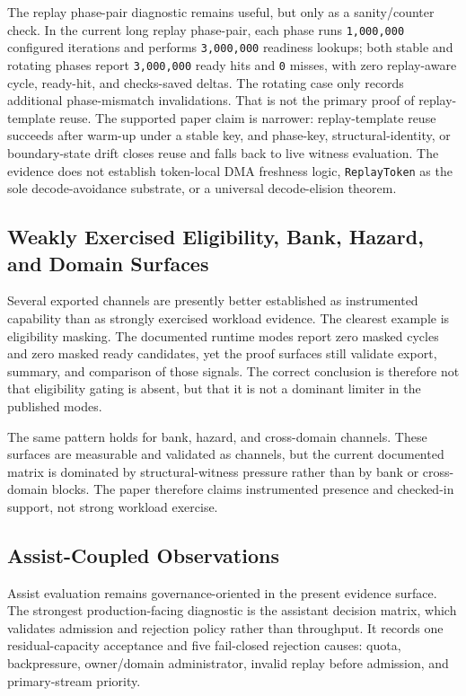 \documentclass[twocolumn]{article}
\begin{document}
The replay phase-pair diagnostic remains useful, but only as a sanity/counter check. In the current long replay phase-pair, each phase runs \texttt{1,000,000} configured iterations and performs \texttt{3,000,000} readiness lookups; both stable and rotating phases report \texttt{3,000,000} ready hits and \texttt{0} misses, with zero replay-aware cycle, ready-hit, and checks-saved deltas. The rotating case only records additional phase-mismatch invalidations. That is not the primary proof of replay-template reuse. The supported paper claim is narrower: replay-template reuse succeeds after warm-up under a stable key, and phase-key, structural-identity, or boundary-state drift closes reuse and falls back to live witness evaluation. The evidence does not establish token-local DMA freshness logic, \texttt{ReplayToken} as the sole decode-avoidance substrate, or a universal decode-elision theorem.


\subsection{Weakly Exercised Eligibility, Bank, Hazard, and Domain Surfaces}

Several exported channels are presently better established as instrumented capability than as strongly exercised workload evidence. The clearest example is eligibility masking. The documented runtime modes report zero masked cycles and zero masked ready candidates, yet the proof surfaces still validate export, summary, and comparison of those signals. The correct conclusion is therefore not that eligibility gating is absent, but that it is not a dominant limiter in the published modes.

The same pattern holds for bank, hazard, and cross-domain channels. These surfaces are measurable and validated as channels, but the current documented matrix is dominated by structural-witness pressure rather than by bank or cross-domain blocks. The paper therefore claims instrumented presence and checked-in support, not strong workload exercise.


\subsection{Assist-Coupled Observations}

Assist evaluation remains governance-oriented in the present evidence surface. The strongest production-facing diagnostic is the assistant decision matrix, which validates admission and rejection policy rather than throughput. It records one residual-capacity acceptance and five fail-closed rejection causes: quota, backpressure, owner/domain administrator, invalid replay before admission, and primary-stream priority.
\end{document}
